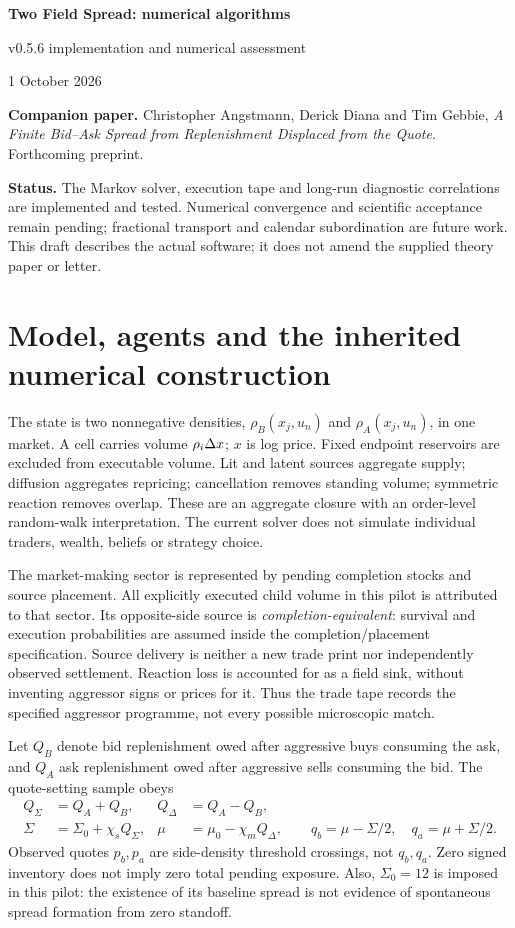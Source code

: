 \documentclass[11pt,a4paper]{article}
\begin{document}
\begin{center}
{\Large\bfseries Two Field Spread: numerical algorithms}\par
{\large v0.5.6 implementation and numerical assessment}\par
1 October 2026
\end{center}
{\small \textbf{Companion paper.} Christopher Angstmann, Derick Diana and Tim Gebbie, \emph{A Finite Bid--Ask Spread from Replenishment Displaced from the Quote}. Forthcoming preprint.}\par

\textbf{Status.} The Markov solver, execution tape and long-run diagnostic correlations are
implemented and tested. Numerical convergence and scientific acceptance
remain pending; fractional transport and calendar subordination are future work. This draft describes the actual
software; it does not amend the supplied theory paper or letter.

\section{Model, agents and the inherited numerical construction}
The state is two nonnegative densities, $\rho_B(x_j,u_n)$ and
$\rho_A(x_j,u_n)$, in one market. A cell carries volume $\rho_i\Delta x$;
$x$ is log price. Fixed endpoint reservoirs are excluded from executable
volume. Lit and latent sources aggregate supply; diffusion aggregates
repricing; cancellation removes standing volume; symmetric reaction removes
overlap. These are an aggregate closure with an order-level random-walk
interpretation. The current solver does not simulate individual traders,
wealth, beliefs or strategy choice.

The market-making sector is represented by pending completion stocks and
source placement. All explicitly executed child volume in this pilot is
attributed to that sector. Its opposite-side source is
\emph{completion-equivalent}: survival and execution probabilities are
assumed inside the completion/placement specification. Source delivery is
neither a new trade print nor independently observed settlement. Reaction
loss is accounted for as a field sink, without inventing aggressor signs or
prices for it. Thus the trade tape records the specified aggressor programme,
not every possible microscopic match.

Let $Q_B$ denote bid replenishment owed after aggressive buys consuming the ask,
and $Q_A$ ask replenishment owed after aggressive sells consuming the bid. The quote-setting sample obeys
\begin{align}
 Q_\Sigma&=Q_A+Q_B,& Q_\Delta&=Q_A-Q_B,\\
 \Sigma&=\Sigma_0+\chi_s Q_\Sigma,&
 \mu&=\mu_0-\chi_m Q_\Delta,\qquad
 q_b=\mu-\Sigma/2,\quad q_a=\mu+\Sigma/2.
\end{align}
Observed quotes $p_b,p_a$ are side-density threshold crossings, not $q_b,q_a$.
Zero signed inventory does not imply zero total pending exposure. Also,
$\Sigma_0=12$ is imposed in this pilot: the existence of its baseline spread
is not evidence of spontaneous spread formation from zero standoff.
\end{document}
